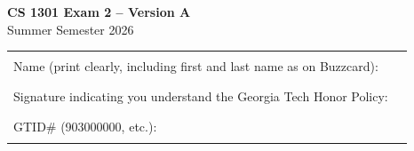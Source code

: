 \documentclass[11pt,addpoints]{exam}
\begin{document}
\begin{center}
  {\Large\bfseries CS 1301 Exam 2 -- Version A}\\[0.25em]
  {\large Summer Semester 2026}
\end{center}

\vspace{0.5em}
\begin{tabularx}{\linewidth}{@{}lX@{}}
Name (print clearly, including first and last name as on Buzzcard): & \rule{\linewidth}{0.4pt} \\[1.2em]
Signature indicating you understand the Georgia Tech Honor Policy: & \rule{\linewidth}{0.4pt} \\[1.2em]
GTID\# (903000000, etc.): & \rule{\linewidth}{0.4pt}
\end{tabularx}

\vspace{0.8em}
\end{document}
